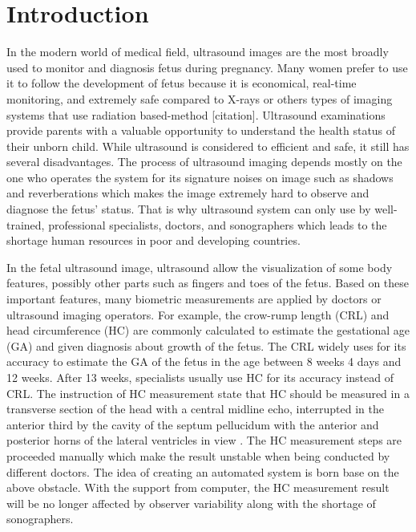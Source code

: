 \chapter{Introduction}
\noindent



	In the modern world of medical field, ultrasound images are the most broadly used to monitor and diagnosis fetus during pregnancy. Many women prefer to use it to follow the development of fetus because it is economical, real-time monitoring, and extremely safe compared to X-rays or others types of imaging systems that use radiation based-method [citation]. Ultrasound examinations provide parents with a valuable opportunity to understand the health status of their unborn child. While ultrasound is considered to efficient and safe, it still has several disadvantages. The process of ultrasound imaging depends mostly on the one who operates the system for its signature noises on image such as shadows and reverberations which makes the image extremely hard to observe and diagnose the fetus’ status. That is why ultrasound system can only use by well-trained, professional specialists, doctors, and sonographers which leads to the shortage human resources in poor and developing countries.
	
	In the fetal ultrasound image, ultrasound allow the visualization of some body features, possibly other parts such as fingers and toes of the fetus. Based on these important features, many biometric measurements are applied by doctors or ultrasound imaging operators. For example, the crow-rump length (CRL) and head circumference (HC) are commonly calculated to estimate the gestational age (GA) and given diagnosis about growth of the fetus. The CRL widely uses for its accuracy to estimate the GA of the fetus in the age between 8 weeks 4 days and 12 weeks.	 After 13 weeks, specialists usually use HC for its accuracy instead of CRL. The instruction of HC measurement state that HC should be measured in a transverse section of the head with a central midline echo, interrupted in the anterior third by the cavity of the septum pellucidum with the anterior and posterior horns of the lateral ventricles in view \cite{thomas}. The HC measurement steps are proceeded manually which make the result unstable when being conducted by different doctors. The idea of creating an automated system is born base on the above obstacle. With the support from computer, the HC measurement result will be no longer affected by observer variability along with the shortage of sonographers.

